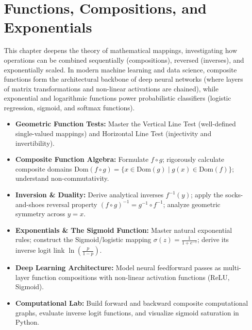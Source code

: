 \chapter{Functions, Compositions, and Exponentials}

This chapter deepens the theory of mathematical mappings, investigating how operations can be combined sequentially (compositions), reversed (inverses), and exponentially scaled. In modern machine learning and data science, composite functions form the architectural backbone of deep neural networks (where layers of matrix transformations and non-linear activations are chained), while exponential and logarithmic functions power probabilistic classifiers (logistic regression, sigmoid, and softmax functions).

\vspace{0.3cm}
\begin{tcolorbox}[colback=primarylight, colframe=primarydark, title={\textbf{Executive Roadmap \& Learning Objectives}}]
\begin{itemize}
    \item \textbf{Geometric Function Tests:} Master the Vertical Line Test (well-defined single-valued mappings) and Horizontal Line Test (injectivity and invertibility).
    \item \textbf{Composite Function Algebra:} Formulate $f \circ g$; rigorously calculate composite domains $\text{Dom}(f \circ g) = \{x \in \text{Dom}(g) \mid g(x) \in \text{Dom}(f)\}$; understand non-commutativity.
    \item \textbf{Inversion \& Duality:} Derive analytical inverses $f^{-1}(y)$; apply the socks-and-shoes reversal property $(f \circ g)^{-1} = g^{-1} \circ f^{-1}$; analyze geometric symmetry across $y = x$.
    \item \textbf{Exponentials \& The Sigmoid Function:} Master natural exponential rules; construct the Sigmoid/logistic mapping $\sigma(z) = \frac{1}{1 + e^{-z}}$; derive its inverse logit link $\ln(\frac{p}{1 - p})$.
    \item \textbf{Deep Learning Architecture:} Model neural feedforward passes as multi-layer function compositions with non-linear activation functions (ReLU, Sigmoid).
    \item \textbf{Computational Lab:} Build forward and backward composite computational graphs, evaluate inverse logit functions, and visualize sigmoid saturation in Python.
\end{itemize}
\end{tcolorbox}
\vspace{0.3cm}

